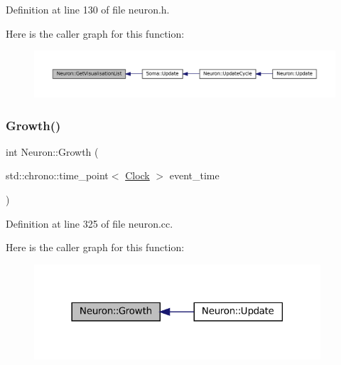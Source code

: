 Definition at line 130 of file neuron.\+h.

Here is the caller graph for this function\+:\nopagebreak
\begin{figure}[H]
\begin{center}
\leavevmode
\includegraphics[width=350pt]{class_neuron_a9af31418d1232135bf5074f6a3d5dbf1_icgraph}
\end{center}
\end{figure}
\mbox{\label{class_neuron_a82b34717999a29e5413ebfcfa58c9356}} 
\subsubsection{\texorpdfstring{Growth()}{Growth()}}
{\footnotesize\ttfamily int Neuron\+::\+Growth (\begin{DoxyParamCaption}\item[{std\+::chrono\+::time\+\_\+point$<$ \mbox{\hyperlink{universe_8h_a0ef8d951d1ca5ab3cfaf7ab4c7a6fd80}{Clock}} $>$}]{event\+\_\+time }\end{DoxyParamCaption})}



Definition at line 325 of file neuron.\+cc.

Here is the caller graph for this function\+:\nopagebreak
\begin{figure}[H]
\begin{center}
\leavevmode
\includegraphics[width=302pt]{class_neuron_a82b34717999a29e5413ebfcfa58c9356_icgraph}
\end{center}
\end{figure}
\mbox{\label{class_neuron_a82d0a4739244d79ff929be01eeb0be28}} 
